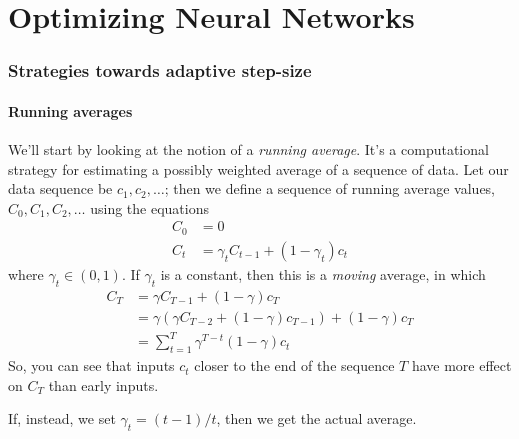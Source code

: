 \chapter{Optimizing Neural Networks}
\label{sec-nn-details}

\subsection{Strategies towards adaptive step-size}\label{adaptive-step-size-appendix}
\subsubsection{Running averages}
We'll start by looking at the notion of a {\em running average}.  It's
a computational strategy for estimating a possibly weighted average of
a sequence  of data.  Let our data sequence be $c_1, c_2, \ldots$;
then we define a sequence of running average values, $C_0, C_1, C_2,
  \ldots$ using the equations
\begin{align*}
  C_0 & = 0                                       \\
  C_t & =  \gamma_t C_{t-1} +  (1 - \gamma_t) c_t
\end{align*}
where $\gamma_t \in (0, 1)$.  If $\gamma_t$ is a constant, then this
is a {\em  moving} average, in which
\begin{align*}
  C_T & = \gamma C_{T-1} + (1  - \gamma) c_T                                  \\
      & = \gamma (\gamma C_{T-2} + (1  - \gamma) c_{T-1}) + (1  - \gamma) c_T \\
      & = \sum_{t = 1}^T \gamma^{T-t}(1 - \gamma) c_t
\end{align*}
So, you can see that inputs $c_t$ closer to the end of the sequence $T$
have  more effect on $C_T$ than early inputs.

If, instead, we set $\gamma_t = (t - 1)  / t$, then we get the actual
average.

